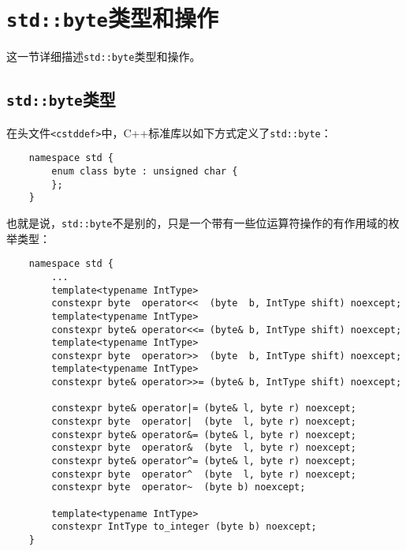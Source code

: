 \section{\texttt{std::byte}类型和操作}
这一节详细描述\texttt{std::byte}类型和操作。

\subsection{\texttt{std::byte}类型}
在头文件\texttt{<cstddef>}中，C++标准库以如下方式定义了\texttt{std::byte}：
\begin{lstlisting}
    namespace std {
        enum class byte : unsigned char {
        };
    }
\end{lstlisting}
也就是说，\texttt{std::byte}不是别的，只是一个带有一些位运算符操作的有作用域的枚举类型：
\begin{lstlisting}
    namespace std {
        ...
        template<typename IntType>
        constexpr byte  operator<<  (byte  b, IntType shift) noexcept;
        template<typename IntType>
        constexpr byte& operator<<= (byte& b, IntType shift) noexcept;
        template<typename IntType>
        constexpr byte  operator>>  (byte  b, IntType shift) noexcept;
        template<typename IntType>
        constexpr byte& operator>>= (byte& b, IntType shift) noexcept;

        constexpr byte& operator|= (byte& l, byte r) noexcept;
        constexpr byte  operator|  (byte  l, byte r) noexcept;
        constexpr byte& operator&= (byte& l, byte r) noexcept;
        constexpr byte  operator&  (byte  l, byte r) noexcept;
        constexpr byte& operator^= (byte& l, byte r) noexcept;
        constexpr byte  operator^  (byte  l, byte r) noexcept;
        constexpr byte  operator~  (byte b) noexcept;

        template<typename IntType>
        constexpr IntType to_integer (byte b) noexcept;
    }
\end{lstlisting}

